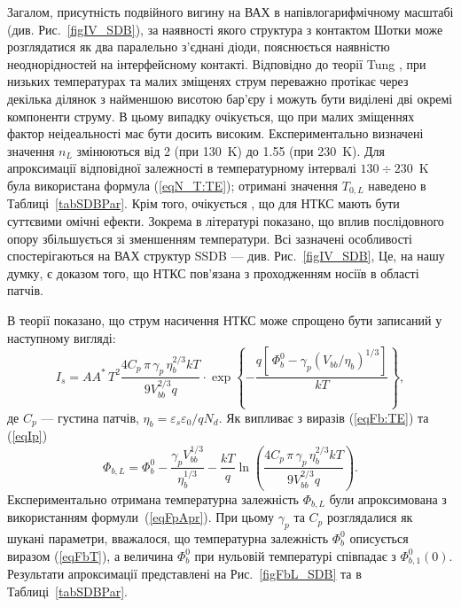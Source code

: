 \documentclass[a4paper,14pt,oneside,openany]{memoir}
\begin{document}
Загалом, присутність подвійного вигину на ВАХ в напівлогарифмічному масштабі (див. Рис.~\ref{figIV_SDB}),
за наявності якого структура з контактом Шотки може розглядатися як два паралельно з'єднані діоди, пояснюється наявністю неоднорідностей на інтерфейсному контакті.
Відповідно до теорії Tung \cite{Tung:PhysRev,Tung:MSE},
при низьких температурах та малих зміщенях струм переважно протікає через декілька ділянок з найменшою висотою бар'єру і можуть бути виділені дві окремі компоненти струму.
В цьому випадку очікується, що при малих зміщеннях фактор неідеальності має бути досить високим.
Експериментально визначені значення $n_L$ змінюються від 2 (при 130~K) до 1.55 (при 230~K).
Для апроксимації відповідної залежності в температурному інтервалі $130\div230$~K була використана формула (\ref{eqN_T:TE});
отримані значення $T_{0,L}$ наведено в Таблиці~\ref{tabSDBPar}.
Крім того, очікується \cite{Tung:PhysRev,Tung:MSE}, що для НТКС мають бути суттєвими омічні ефекти.
Зокрема в літературі  \cite{Gammon2013} показано, що вплив послідовного опору збільшується зі зменшенням температури.
Всі зазначені особливості спостерігаються на ВАХ структур SSDB --- див. Рис.~\ref{figIV_SDB},
Це, на нашу думку, є доказом того, що НТКС пов'язана з проходженням носіїв в області патчів.


В теорії \cite{Tung:PhysRev} показано, що струм насичення НТКС може спрощено бути записаний у наступному вигляді:
\begin{equation}
\label{eqIp}
I_s=AA^*\,T^2\frac{4C_p\,\pi\,\gamma_p\,\eta_b^{2/3}kT}{9V_{bb}^{2/3}q}\cdot
\exp\left\{-\frac{q\left[\,\Phi_{b}^0-\gamma_p (V_{bb}/\eta_b)^{1/3}\right]}{kT}\right\},
\end{equation}
де
$C_p$ --- густина патчів,
$\eta_{b}=\varepsilon_s\varepsilon_0/qN_d$.
Як випливає з виразів (\ref{eqFb:TE}) та (\ref{eqIp})
\begin{equation}
\label{eqFpApr}
\Phi_{b,L}=\Phi_{b}^0-\frac{\gamma_p V_{bb}^{1/3}}{\eta_b^{1/3}} -\frac{kT}{q}\ln\left(\frac{4C_p\,\pi\,\gamma_p\,\eta_b^{2/3}kT}{9V_{bb}^{2/3}q}\right).
\end{equation}
Експериментально отримана температурна залежність $\Phi_{b,L}$ були апроксимована з використанням формули~(\ref{eqFpApr}).
При цьому $\gamma_p$ та $C_p$ розглядалися як шукані параметри,
вважалося, що температурна залежність $\Phi_{b}^0$ описується виразом (\ref{eqFbT}), а величина $\Phi_{b}^0$ при нульовій температурі
співпадає з $\Phi_{b,1}^0(0)$.
Результати апроксимації представлені на Рис.~\ref{figFbL_SDB} та в Таблиці~\ref{tabSDBPar}.
\end{document}
